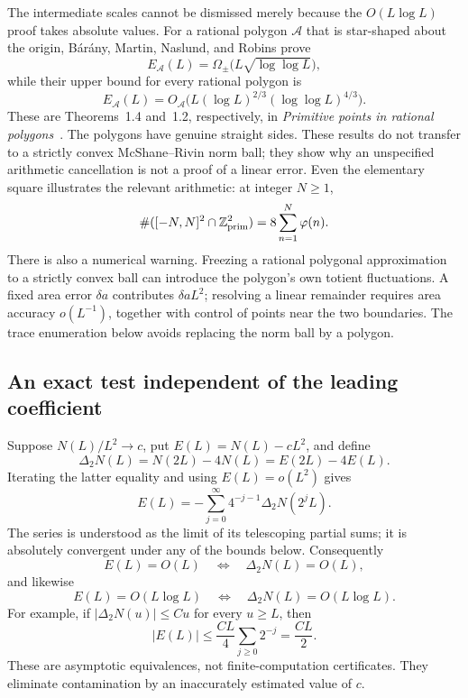 The intermediate scales cannot be dismissed merely because the
$O(L\log L)$ proof takes absolute values. For a rational polygon
$\mathcal A$ that is star-shaped about the origin, B\'ar\'any,
Martin, Naslund, and Robins prove
\[
 E_{\mathcal A}(L)
 =\Omega_\pm\bigl(L\sqrt{\log\log L}\bigr),
\]
while their upper bound for every rational polygon is
\[
 E_{\mathcal A}(L)
 =O_{\mathcal A}\bigl(L(\log L)^{2/3}
                         (\log\log L)^{4/3}\bigr).
\]
These are Theorems~1.4 and~1.2, respectively, in
\emph{Primitive points in rational polygons}~\cite{BaranyPrimitivePolygons}.
The polygons have genuine straight sides. These results do not
transfer to a strictly convex McShane--Rivin norm ball; they show
why an unspecified arithmetic cancellation is not a proof of a
linear error. Even the elementary square illustrates the relevant
arithmetic: at integer $N\ge1$,
\[
 \#([-N,N]^2\cap\mathbb Z^2_{\rm prim})
 =8\sum_{n=1}^N\varphi(n).
\]
There is also a numerical warning. Freezing a rational polygonal
approximation to a strictly convex ball can introduce the polygon's own
totient fluctuations. A fixed area error $\delta a$ contributes
$\delta a L^2$; resolving a linear remainder requires area accuracy
$o(L^{-1})$, together with control of points near the two boundaries.
The trace enumeration below avoids replacing the norm ball by a polygon.

\subsection{An exact test independent of the leading coefficient}
\label{subsec:dyadicdiagnostic}

Suppose $N(L)/L^2\to c$, put $E(L)=N(L)-cL^2$, and define
\[
 \Delta_2N(L)=N(2L)-4N(L)=E(2L)-4E(L).
\]
Iterating the latter equality and using $E(L)=o(L^2)$ gives
\begin{equation}
 E(L)=-\sum_{j=0}^\infty4^{-j-1}\Delta_2N(2^jL).
 \label{eq:dyadicerrorinverse}
\end{equation}
The series is understood as the limit of its telescoping partial
sums; it is absolutely convergent under any of the bounds below.
Consequently
\[
 E(L)=O(L)\quad\Longleftrightarrow\quad
 \Delta_2N(L)=O(L),
\]
and likewise
\[
 E(L)=O(L\log L)\quad\Longleftrightarrow\quad
 \Delta_2N(L)=O(L\log L).
\]
For example, if $|\Delta_2N(u)|\le Cu$ for every $u\ge L$, then
\[
 |E(L)|\le\frac{CL}{4}\sum_{j\ge0}2^{-j}=\frac{CL}{2}.
\]
These are asymptotic equivalences, not finite-computation certificates.
They eliminate contamination by an inaccurately estimated value of $c$.

